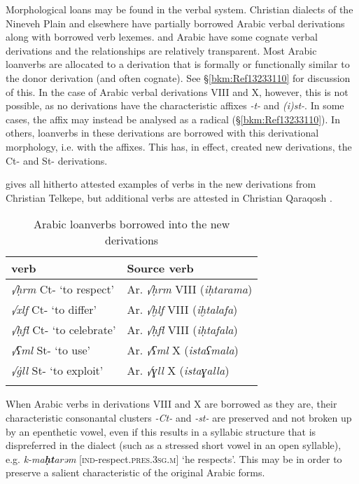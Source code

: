 \documentclass[output=paper]{langsci/langscibook}
\begin{document}
Morphological loans may be found in the verbal system. Christian  dialects of the Nineveh Plain and elsewhere have partially borrowed Arabic verbal derivations along with borrowed verb lexemes.  and Arabic have some {cognate} verbal derivations and the relationships are relatively transparent. Most Arabic loanverbs are allocated to a  {derivation} that is formally or functionally similar to the donor {derivation} (and often {cognate}). See §\ref{bkm:Ref13233110} for discussion of this. In the case of Arabic verbal derivations VIII and X, however, this is not possible, as no  derivations have the characteristic affixes \textit{{}-t-} and \textit{(i)st-}. In some cases, the affix may instead be analysed as a radical (§\ref{bkm:Ref13233110}). In others, loanverbs in these derivations are borrowed with this {derivational} morphology, i.e. with the affixes. This has, in effect, created new derivations, the Ct- and St- derivations.

 gives all hitherto attested examples of verbs in the new derivations from Christian Telkepe, but additional verbs are attested in Christian Qaraqosh \citep[130]{Khan2002}.

\begin{table}
\caption{Arabic loanverbs borrowed into the new  derivations\label{tab:coghill:1}}
\begin{tabularx}{.75\textwidth}{QQ}
\lsptoprule
{ verb} & {Source verb}\\\midrule
{\textit{√ḥrm} Ct- ‘to respect’} & {Ar. \textit{√ḥrm} VIII (\textit{iḥtarama})}\\
\textit{√xlf} Ct- ‘to differ’ & {Ar. \textit{√ḫlf} VIII (\textit{iḫtalafa})}\\
{\textit{√ḥfl} Ct- ‘to celebrate’} & {Ar. \textit{√ḥfl} VIII (\textit{iḥtafala})}\\
{\textit{√ʕml} St- ‘to use’} & {Ar. \textit{√ʕml} X (\textit{istaʕmala})}\\
\textit{√\.gll} St- ‘to exploit’ & {Ar. \textit{√ɣll} X (\textit{istaɣalla})}\\
\lspbottomrule
\end{tabularx}
\end{table}

When Arabic verbs in derivations VIII and X are borrowed as they are, their characteristic consonantal clusters \textit{{}-Ct-} and \textit{{}-st-} are preserved and not broken up by an epenthetic vowel, even if this results in a {syllabic structure} that is dispreferred in the  dialect (such as a stressed short vowel in an open syllable), e.g. \textit{k-ma}\kern -0.5pt\textbf{\textit{ḥt}}\kern -1pt\textit{arəm} [\textsc{ind}\nobreakdash-respect.\textsc{pres.}3\textsc{sg.m}] ‘he respects’. This may be in order to preserve a salient characteristic of the original Arabic forms.
\end{document}
